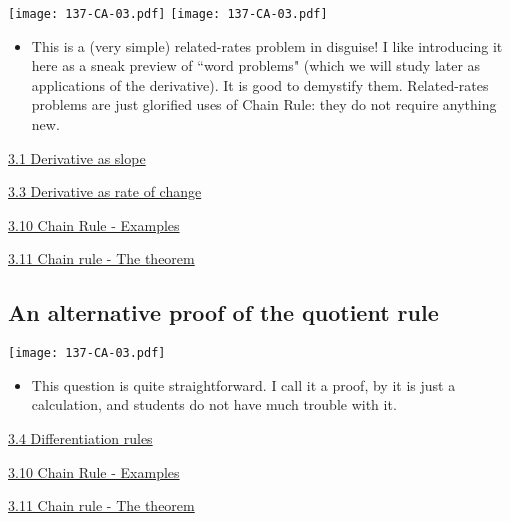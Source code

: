 \documentclass[11pt]{article}
\newcommand{\nl}{\hfill \vspace{-1.1\baselineskip}} %
\newcommand{\vi}{\hspace{8mm} \href{https://www.youtube.com/watch?v=7vhux5TLRmQ&list=PLlwePzQY_wW8qiZD6XYqCnibdY37ygbx7&index=1}{3.1 Derivative as slope}}
\newcommand{\viii}{\hspace{8mm} \href{https://www.youtube.com/watch?v=fUjLN1ZEDBc&list=PLlwePzQY_wW8qiZD6XYqCnibdY37ygbx7&index=3}{3.3 Derivative as rate of change}}
\newcommand{\viv}{\hspace{8mm} \href{https://www.youtube.com/watch?v=k_VxtK1U9jk&list=PLlwePzQY_wW8qiZD6XYqCnibdY37ygbx7&index=4}{3.4 Differentiation rules}}
\newcommand{\vx}{\hspace{8mm} \href{https://www.youtube.com/watch?v=Qht28m7b13U&list=PLlwePzQY_wW8qiZD6XYqCnibdY37ygbx7&index=10}{3.10 Chain Rule - Examples}}
\newcommand{\vxi}{\hspace{8mm} \href{https://www.youtube.com/watch?v=DQiXqChpeAc&list=PLlwePzQY_wW8qiZD6XYqCnibdY37ygbx7&index=11}{3.11 Chain rule - The theorem}}
\begin{document}
\begin{center}
{ \texttt{[image: 137-CA-03.pdf]}}  \quad
{ \texttt{[image: 137-CA-03.pdf]}}  
\end{center}


\begin{comments}
\nl
	\begin{itemize}
		\item  This is a (very simple) related-rates problem in disguise!  I like introducing it here as a sneak preview of ``word problems"  (which we will study later as applications of the derivative).  It is good to demystify them.  Related-rates problems are just glorified uses of Chain Rule: they do not require anything new.
	\end{itemize}
	
\end{comments}

\begin{videos}
\vi

\viii

\vx

\vxi
\end{videos}

\newpage

\subsection{An alternative proof of the quotient rule} 

\begin{center}
{ \texttt{[image: 137-CA-03.pdf]}}

\end{center}


\begin{comments}
\nl
	\begin{itemize}
		\item  This question is quite straightforward.  I call it a proof, by it is just a calculation, and students do not have much trouble with it.
	\end{itemize}
\end{comments}

\begin{videos}
\viv

\vx

\vxi

\end{videos}

\newpage
\end{document}
